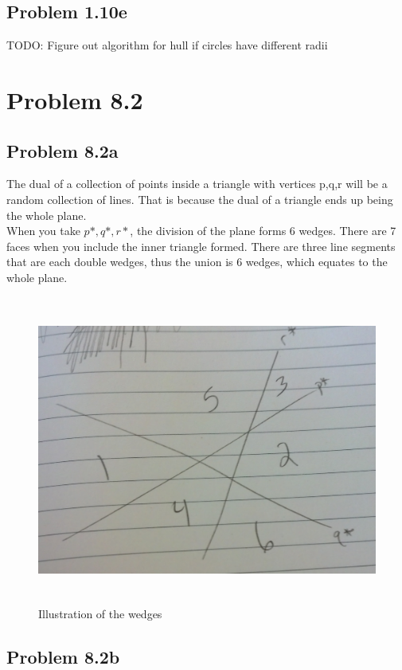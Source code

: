 \documentclass[11pt,psfig]{article}
\begin{document}
\subsection*{Problem 1.10e}

TODO: Figure out algorithm for hull if circles have different radii


\section*{Problem 8.2}

\subsection*{Problem 8.2a}

The dual of a collection of points inside a triangle with vertices p,q,r will be a random collection of lines. That is because the dual of a triangle ends up being the whole plane. 
\\
When you take $p*, q*, r*$, the division of the plane forms 6 wedges. There are 7 faces when you include the inner triangle formed. There are three line segments that are each double wedges, thus the union is 6 wedges, which equates to the whole plane. 

\begin{figure}[H]
\centering
\includegraphics[height=4in]{cs266dual.jpg}
\caption{Illustration of the wedges}
\end{figure}

\subsection*{Problem 8.2b}
\end{document}
